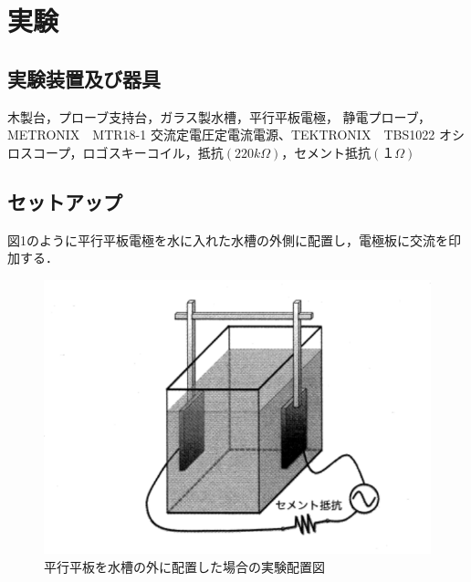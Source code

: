 
\section{実験}

\subsection{実験装置及び器具}
木製台，プローブ支持台，ガラス製水槽，平行平板電極，
静電プローブ，METRONIX　MTR18-1 交流定電圧定電流電源、TEKTRONIX　TBS1022
オシロスコープ，ロゴスキーコイル，抵抗$(220\si{k\Omega})$，セメント抵抗$(１\si{\Omega})$

\subsection{セットアップ}
図1のように平行平板電極を水に入れた水槽の外側に配置し，電極板に交流を印加する．
\begin{figure}[H]
    \centering
    \includegraphics[scale=0.75]{figure1.pdf}
    \caption{平行平板を水槽の外に配置した場合の実験配置図}
\end{figure}

\newpage

